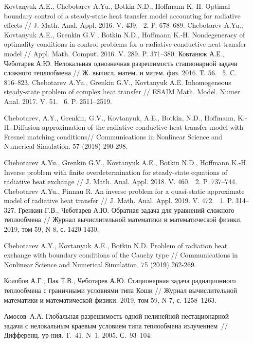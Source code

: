 \begin{thebibliography}{999}
    Kovtanyuk A.E., Chebotarev A.Yu., Botkin N.D., Hoffmann K.-H. Optimal boundary control of a steady-state heat transfer model accounting for radiative effects // J. Math. Anal. Appl.
    2016. V. 439. \textnumero~2. P. 678--689.
    Chebotarev A.Yu., Kovtanyuk A.E., Grenkin G.V., Botkin N.D., Hoffmann K.-H\@.
    Nondegeneracy of optimality conditions in control problems for a radiative-conductive heat transfer model // Appl. Math. Comput. 2016. V. 289. P. 371--380.
    Ковтанюк А.Е., Чеботарев А.Ю. Нелокальная однозначная разрешимость стационарной задачи сложного теплообмена // Ж. вычисл. матем. и матем. физ. 2016. Т. 56. \textnumero~5. С. 816--823.
    Chebotarev A.Yu., Grenkin G.V., Kovtanyuk A.E. Inhomogeneous steady-state problem of complex heat transfer // ESAIM Math. Model. Numer. Anal. 2017. V. 51. \textnumero~6. P. 2511--2519.

    Chebotarev, A.Y., Grenkin, G.V., Kovtanyuk, A.E., Botkin, N.D., Hoffmann, K.-H. Diffusion approximation of the radiative-conductive heat transfer model with Fresnel matching conditions// Communications in Nonlinear Science and Numerical Simulation. 57 (2018) 290-298.

    Chebotarev A.Yu., Grenkin G.V., Kovtanyuk A.E., Botkin N.D., Hoffmann K.-H. Inverse problem with finite overdetermination for steady-state equations of radiative heat exchange // J. Math. Anal. Appl. 2018. V. 460. \textnumero~2. P. 737--744.
    Chebotarev A.Yu., Pinnau R. An inverse problem for a quasi-static approximate model of radiative heat transfer // J. Math. Anal. Appl. 2019. V. 472. \textnumero~1. P. 314--327.
     Гренкин Г.В., Чеботарев А.Ю. Обратная задача для уравнений сложного теплообмена // Журнал вычислительной математики и математической физики. 2019, том 59, N 8, с. 1420-1430.

    Chebotarev A.Y., Kovtanyuk A.E., Botkin N.D. Problem of radiation heat exchange with boundary conditions of the Cauchy type // Communications in Nonlinear Science and Numerical Simulation. 75 (2019) 262-269.

    Колобов А.Г., Пак Т.В., Чеботарев А.Ю.
    Стационарная задача радиационного теплообмена с граничными условиями типа Коши
    // Журнал вычислительной математики и математической физики.
    2019, том 59, N 7, с. 1258--1263.

    Амосов~А.А. Глобальная разрешимость одной нелинейной
    нестационарной задачи с нелокальным краевым условием типа
    теплообмена излучением~// Дифференц. ур-ния. Т.~41. N~1.
    2005. С.~93--104.


\end{thebibliography}
